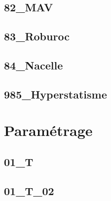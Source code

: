 \subsection{82\_MAV}
\graphicspath{{../02-Modélisation des mécanismes/TD/Hyperstatisme/82_MAV/images/}{../02-Modélisation des mécanismes/TD/Hyperstatisme/82_MAV/}{../Style/png/}}


\subsection{83\_Roburoc}
\graphicspath{{../02-Modélisation des mécanismes/TD/Hyperstatisme/83_Roburoc/images/}{../02-Modélisation des mécanismes/TD/Hyperstatisme/83_Roburoc/}{../Style/png/}}


\subsection{84\_Nacelle}
\graphicspath{{../02-Modélisation des mécanismes/TD/Hyperstatisme/84_Nacelle/images/}{../02-Modélisation des mécanismes/TD/Hyperstatisme/84_Nacelle/}{../Style/png/}}


\subsection{985\_Hyperstatisme}
\graphicspath{{../02-Modélisation des mécanismes/TD/Hyperstatisme/985_Hyperstatisme/images/}{../02-Modélisation des mécanismes/TD/Hyperstatisme/985_Hyperstatisme/}{../Style/png/}}


\section{Paramétrage}

\subsection{01\_T}
\graphicspath{{../02-Modélisation des mécanismes/TD/Paramétrage/01_T/images/}{../02-Modélisation des mécanismes/TD/Paramétrage/01_T/}{../Style/png/}}


\subsection{01\_T\_02}
\graphicspath{{../02-Modélisation des mécanismes/TD/Paramétrage/01_T_02/images/}{../02-Modélisation des mécanismes/TD/Paramétrage/01_T_02/}{../Style/png/}}



